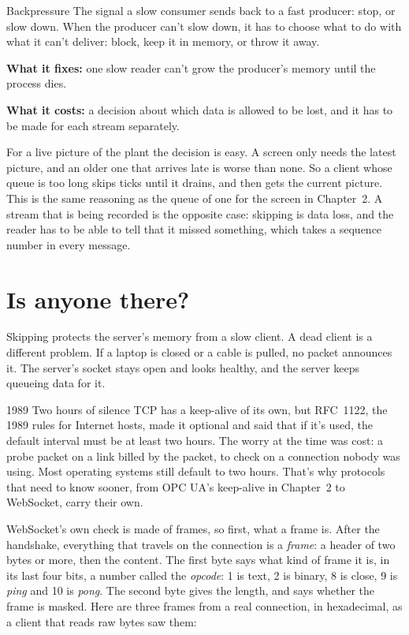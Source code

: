 \begin{concept}{Backpressure}
The signal a slow consumer sends back to a fast producer: stop, or slow down.
When the producer can't slow down, it has to choose what to do with what it
can't deliver: block, keep it in memory, or throw it away.

\textbf{What it fixes:} one slow reader can't grow the producer's memory until
the process dies.

\textbf{What it costs:} a decision about which data is allowed to be lost, and
it has to be made for each stream separately.
\end{concept}

For a live picture of the plant the decision is easy. A screen only needs the
latest picture, and an older one that arrives late is worse than none. So a
client whose queue is too long skips ticks until it drains, and then gets the
current picture. This is the same reasoning as the queue of one for the screen
in Chapter~2. A stream that is being recorded is the opposite case: skipping is
data loss, and the reader has to be able to tell that it missed something,
which takes a sequence number in every message.

\section{Is anyone there?}

Skipping protects the server's memory from a slow client. A dead client is a
different problem. If a laptop is closed or a cable is pulled, no packet
announces it. The server's socket stays open and looks healthy, and the server
keeps queueing data for it.

\begin{history}{1989 \textperiodcentered{} Two hours of silence}
TCP has a keep-alive of its own, but RFC~1122, the 1989 rules for Internet
hosts, made it optional and said that if it's used, the default interval must be
at least two hours. The worry at the time was cost: a probe packet on a link
billed by the packet, to check on a connection nobody was using. Most operating
systems still default to two hours. That's why protocols that need to know
sooner, from OPC UA's keep-alive in Chapter~2 to WebSocket, carry their own.
\end{history}

WebSocket's own check is made of frames, so first, what a frame is. After the
handshake, everything that travels on the connection is a \emph{frame}: a header
of two bytes or more, then the content. The first byte says what kind of frame
it is, in its last four bits, a number called the \emph{opcode}: 1 is text, 2 is
binary, 8 is close, 9 is \emph{ping} and 10 is \emph{pong}. The second byte
gives the length, and says whether the frame is masked. Here are three frames
from a real connection, in hexadecimal, as a client that reads raw bytes saw
them:

